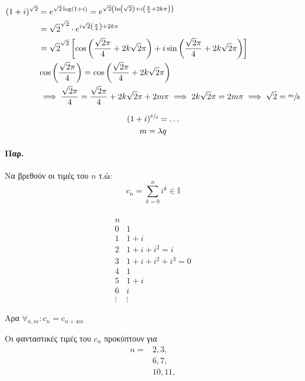 \documentclass[12pt,a4paper,notitlepage,fleqn]{article}
\begin{document}
    \begin{align*}
    (1+i)^{\sqrt{2}} &= e^{\sqrt{2}\log(1+i)} = e^{\sqrt{2}\left(
    	\ln\left(\sqrt{2}\right)+i\left(\frac{\pi}{4}+2k\pi\right)
    	\right)} \\ &=
    \sqrt{2}^{\sqrt{2}}\cdot e^{i\sqrt{2}\left(\frac{\pi}{4}\right)+2k\pi}
    \\ &=
    \sqrt{2}^{\sqrt{2}}
    \left[
    \cos\left(\frac{\sqrt{2}\pi}{4}+2k\sqrt{2}\pi\right)
    +i\sin\left(\frac{\sqrt{2}\pi}{4}+2k\sqrt{2}\pi\right)
    \right]
    \\ & \cos\left( \frac{\sqrt{2}\pi}{4} \right) = \cos\left(
    \frac{\sqrt{2}\pi}{4}+2k\sqrt{2}\pi
    \right)\\ & \implies \frac{\sqrt{2}\pi}{4}=
    \frac{\sqrt{2}\pi}{4}+2k\sqrt{2}\pi+2m\pi \implies
    2k\sqrt{2}\pi=2m\pi\implies \sqrt{2}=\sfrac{m}{k}
    \end{align*}

    \begin{gather*}
    (1+i)^{\sfrac{p}{q}}=\dots\\ m=\lambda q
    \end{gather*}

    \paragraph{Παρ.}
    Να βρεθούν οι τιμές του \( n \) τ.ώ:
    \[
    c_n = \sum_{k=0}^n i^k \in \mathbb I
    \]

    \subparagraph{}
    \[
    \begin{array}{r|l}
    n & \\ \hline
    0 & 1 \\ 1 & 1+i \\ 2 & 1+i+i^2=i \\ 3 & 1+i+i^2+i^3=0 \\ 4 & 1
    \\ \hline
    5 & 1+i \\ 6 & i \\ \vdots & \vdots
    \end{array}
    \]

    Αρα \( \forall_{n,m}: c_n=c_{n+4m} \)

    Οι φανταστικές τιμές του \( c_n \) προκύπτουν για
    \begin{align*}
    	n =& 2,3, \\& 6,7, \\ & 10,11,
    \end{align*}
\end{document}
